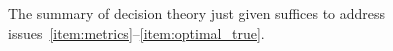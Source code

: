 \documentclass[\ifafour a4paper,12pt,\else a5paper,10pt,\fi%
onecolumn,oneside,article,%
british%
]{memoir}
\makeatletter
\theoremstyle{remark}
\theoremstyle{innote}
\def\sum{\DOTSI\sumop\slimits@}
\renewcommand*{\|}[1][]{\nonscript\:#1\vert\nonscript\:\mathopen{}}
\newcommand*{\nd}{n_{\textrm{d}}}
\newcommand*{\nc}{n_{\textrm{c}}}
\makeatother
\begin{document}



\bigskip

The summary of decision theory just given suffices to address issues~\ref{item:metrics}--\ref{item:optimal_true}.
\end{document}
